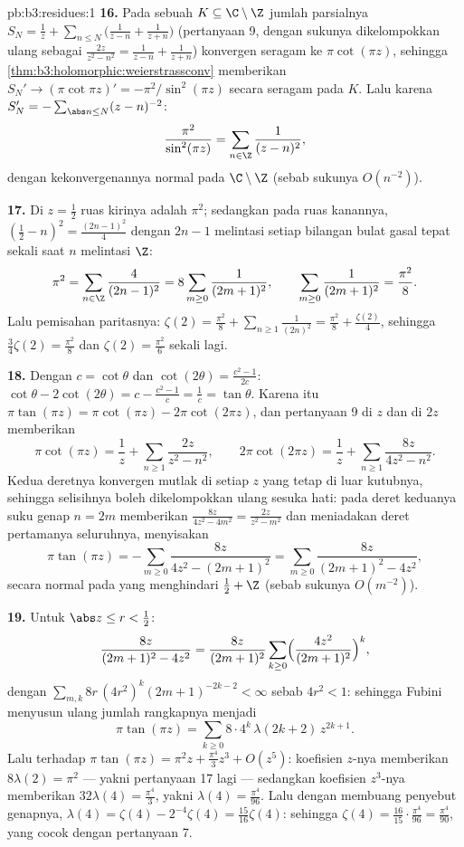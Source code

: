 \begin{solution}{pb:b3:residues:1}
\textbf{16.} Pada sebuah  $K \subseteq \C\setminus\Z$
jumlah parsialnya $S_N = \frac1z + \sum_{n\leq N}\bigl(
\frac1{z-n} + \frac1{z+n}\bigr)$ (pertanyaan 9, dengan sukunya
dikelompokkan ulang sebagai $\frac{2z}{z^2-n^2} = \frac1{z-n} +
\frac1{z+n}$) konvergen seragam ke $\pi\cot(\pi z)$, sehingga
\cref{thm:b3:holomorphic:weierstrassconv} memberikan $S_N' \to
(\pi\cot\pi z)' = -\pi^2/\sin^2(\pi z)$ secara seragam pada $K$.
Lalu karena $S_N' = -\sum_{\abs n\leq N}(z - n)^{-2}$:
\[
\frac{\pi^2}{\sin^2(\pi z)} =
\sum_{n\in\Z}\frac1{(z - n)^2} ,
\]
dengan kekonvergenannya normal pada  $\C\setminus\Z$
(sebab sukunya $O(n^{-2})$).

\textbf{17.} Di $z = \frac12$ ruas kirinya adalah $\pi^2$; sedangkan pada
ruas kanannya, $(\frac12 - n)^2 = \frac{(2n-1)^2}4$ dengan $2n -
1$ melintasi setiap bilangan bulat gasal tepat sekali saat $n$ melintasi
$\Z$:
\[
\pi^2 = \sum_{n\in\Z}\frac{4}{(2n-1)^2}
= 8\sum_{m\geq0}\frac1{(2m+1)^2},
\qquad
\sum_{m\geq0}\frac1{(2m+1)^2} = \frac{\pi^2}8 .
\]
Lalu pemisahan paritasnya: $\zeta(2) = \frac{\pi^2}8 +
\sum_{n\geq1}\frac1{(2n)^2} = \frac{\pi^2}8 +
\frac{\zeta(2)}4$, sehingga $\frac34\zeta(2) = \frac{\pi^2}8$ dan
$\zeta(2) = \frac{\pi^2}6$ sekali lagi.

\textbf{18.} Dengan $c = \cot\theta$ dan $\cot(2\theta) =
\frac{c^2-1}{2c}$: $\cot\theta - 2\cot(2\theta) = c -
\frac{c^2-1}c = \frac1c = \tan\theta$. Karena itu $\pi\tan(\pi z)
= \pi\cot(\pi z) - 2\pi\cot(2\pi z)$, dan pertanyaan 9 di $z$
dan di $2z$ memberikan
\[
\pi\cot(\pi z) = \frac1z +
\sum_{n\geq1}\frac{2z}{z^2 - n^2},
\qquad
2\pi\cot(2\pi z) = \frac1z +
\sum_{n\geq1}\frac{8z}{4z^2 - n^2} .
\]
Kedua deretnya konvergen mutlak di setiap $z$ yang tetap di luar
kutubnya, sehingga selisihnya boleh dikelompokkan ulang sesuka hati: pada
deret keduanya suku genap $n = 2m$ memberikan $\frac{8z}{4z^2 -
4m^2} = \frac{2z}{z^2 - m^2}$ dan meniadakan deret pertamanya
seluruhnya, menyisakan
\[
\pi\tan(\pi z) = -\sum_{m\geq0}\frac{8z}{4z^2 - (2m+1)^2}
= \sum_{m\geq0}\frac{8z}{(2m+1)^2 - 4z^2} ,
\]
secara normal pada  yang menghindari $\frac12 + \Z$ (sebab sukunya
$O(m^{-2})$).

\textbf{19.} Untuk $\abs z \leq r < \frac12$:
\[
\frac{8z}{(2m+1)^2 - 4z^2} = \frac{8z}{(2m+1)^2}
\sum_{k\geq0}\Bigl(\frac{4z^2}{(2m+1)^2}\Bigr)^{k},
\]
dengan $\sum_{m,k}8r\,(4r^2)^k(2m+1)^{-2k-2} < \infty$ sebab
$4r^2 < 1$: sehingga Fubini menyusun ulang jumlah rangkapnya menjadi
\[
\pi\tan(\pi z) =
\sum_{k\geq0}8\cdot4^k\,\lambda(2k+2)\,z^{2k+1} .
\]
Lalu terhadap $\pi\tan(\pi z) = \pi^2z + \frac{\pi^4}3z^3 +
O(z^5)$: koefisien $z$-nya memberikan $8\lambda(2) = \pi^2$
--- yakni pertanyaan 17 lagi --- sedangkan koefisien $z^3$-nya memberikan
$32\lambda(4) = \frac{\pi^4}3$, yakni $\lambda(4) =
\frac{\pi^4}{96}$. Lalu dengan membuang penyebut genapnya,
$\lambda(4) = \zeta(4) - 2^{-4}\zeta(4) =
\frac{15}{16}\zeta(4)$: sehingga $\zeta(4) = \frac{16}{15}\cdot
\frac{\pi^4}{96} = \frac{\pi^4}{90}$, yang cocok dengan pertanyaan 7.


\end{solution}

